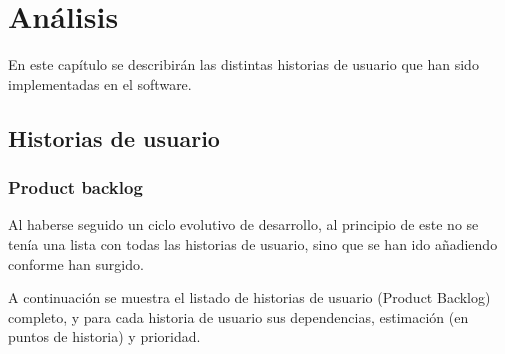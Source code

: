 \chapter{Análisis}

En este capítulo se describirán las distintas historias de usuario que han sido implementadas en el software.

\section{Historias de usuario}

\subsection{Product backlog}

Al haberse seguido un ciclo evolutivo de desarrollo, al principio de este no se tenía una lista con todas las historias de usuario, sino que se han ido añadiendo conforme han surgido.

A continuación se muestra el listado de historias de usuario (Product Backlog) completo, y para cada historia de usuario sus dependencias, estimación (en puntos de historia) y prioridad.

